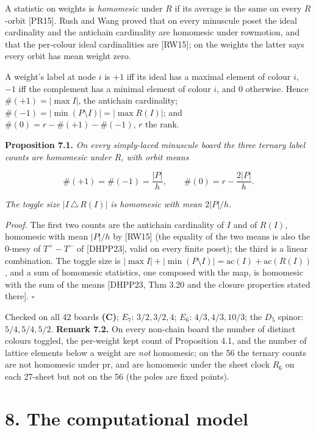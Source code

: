 \documentclass[
]{article}
\begin{document}
A statistic on weights is \emph{homomesic} under \(R\) if its average is
the same on every \(R\)-orbit {[}PR15{]}. Rush and Wang proved that on
every minuscule poset the ideal cardinality and the antichain
cardinality are homomesic under rowmotion, and that the per-colour ideal
cardinalities are {[}RW15{]}; on the weights the latter says every orbit
has mean weight zero.

A weight's label at node \(i\) is \(+1\) iff its ideal has a maximal
element of colour \(i\), \(-1\) iff the complement has a minimal element
of colour \(i\), and \(0\) otherwise. Hence \(\#(+1) = |\max I|\), the
antichain cardinality; \(\#(-1) = |\min(P \setminus I)| = |\max R(I)|\);
and \(\#(0) = r - \#(+1) - \#(-1)\), \(r\) the rank.

\textbf{Proposition 7.1.} \emph{On every simply-laced minuscule board
the three ternary label counts are homomesic under \(R\), with orbit
means}

\[\#(+1) = \#(-1) = \frac{|P|}{h}, \qquad \#(0) = r - \frac{2|P|}{h} .\]

\emph{The toggle size \(|I \,\triangle\, R(I)|\) is homomesic with mean
\(2|P|/h\).}

\emph{Proof.} The first two counts are the antichain cardinality of
\(I\) and of \(R(I)\), homomesic with mean \(|P|/h\) by {[}RW15{]} (the
equality of the two means is also the 0-mesy of \(T^+ - T^-\) of
{[}DHPP23{]}, valid on every finite poset); the third is a linear
combination. The toggle size is
\(|\max I| + |\min(P \setminus I)| = \mathrm{ac}(I) + \mathrm{ac}(R(I))\),
and a sum of homomesic statistics, one composed with the map, is
homomesic with the sum of the means {[}DHPP23, Thm 3.20 and the closure
properties stated there{]}. \(\square\)

Checked on all 42 boards \textbf{(C)}; \(E_7\): \(3/2, 3/2, 4\);
\(E_6\): \(4/3, 4/3, 10/3\); the \(D_5\) spinor: \(5/4, 5/4, 5/2\).
\textbf{Remark 7.2.} On every non-chain board the number of distinct
colours toggled, the per-weight kept count of Proposition 4.1, and the
number of lattice elements below a weight are \emph{not} homomesic; on
the 56 the ternary counts are not homomesic under \(\mathrm{pr}\), and
are homomesic under the sheet clock \(R_6\) on each 27-sheet but not on
the 56 (the poles are fixed points).

\section{8. The computational model}\label{the-computational-model}
\end{document}
